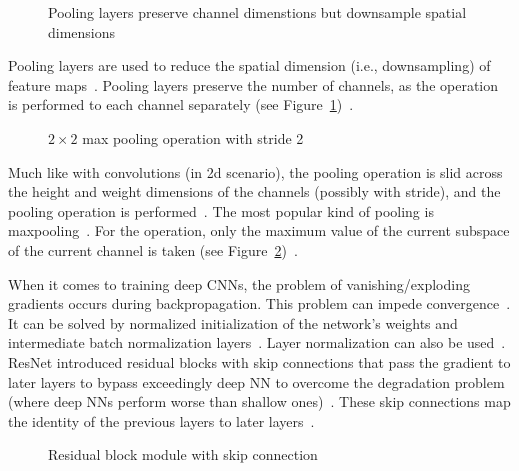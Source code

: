 \begin{figure}[h]
    \centering
    \caption[Channel dimension preserving of pooling layers]{%
        Pooling layers preserve channel dimenstions but downsample spatial
        dimensions\label{fig:pool-layer}
    }
\end{figure}
Pooling layers are used to reduce the spatial dimension (i.e., downsampling) of feature
maps~\citep{ponti_everything_2017}.
Pooling layers preserve the number of channels, as the operation is performed to each channel
separately (see Figure~\ref{fig:pool-layer})~\citep{chauhan_review_2018}.
\begin{figure}[ht]
    \centering
    \caption[Visualization of a max pooling operation]{%
        $2\times 2$ max pooling operation with stride
        2~\citep{chauhan_review_2018}\label{fig:maxpool}
    }
\end{figure}
Much like with convolutions (in 2d scenario), the pooling operation is slid across the height and
weight dimensions of the channels (possibly with stride), and the pooling operation is
performed~\citep{ponti_everything_2017,chauhan_review_2018}.
The most popular kind of pooling is maxpooling~\citep{ponti_everything_2017}.
For the operation, only the maximum value of the current subspace of the current channel is
taken (see Figure~\ref{fig:maxpool})~\citep{chauhan_review_2018}.

When it comes to training deep \acp{CNN}, the problem of vanishing/exploding gradients occurs during
backpropagation.
This problem can impede convergence~\citep{he_deep_2015}.
It can be solved by normalized initialization of the network's weights and intermediate
batch normalization layers~\citep{he_deep_2015,bjorck_understanding_2018}.
Layer normalization can also be used~\citep{liu_rethinking_2021,ba_layer_2016}.
ResNet introduced residual blocks with skip connections that pass the gradient to later layers
to bypass exceedingly deep \ac{NN} to overcome the degradation problem (where deep \acp{NN} perform
worse than shallow ones)~\citep{he_deep_2015}.
These skip connections map the identity of the previous layers to later
layers~\citep{he_deep_2015}.
\begin{figure}[ht]
    \centering
    \caption[Skip connection introduced by residual blocks]{%
        Residual block module with skip
        connection~\citep{he_deep_2015}\label{fig:skip-conn}
    }
\end{figure}

